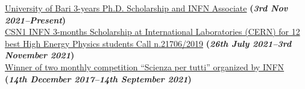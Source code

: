 \documentclass[11pt]{res}
\begin{document}
\begin{resume}
\href{https://dottorato.fisica.uniba.it}{University of Bari 3-years Ph.D. Scholarship and INFN Associate} \textbf{(\textit{3rd Nov 2021--Present})}\\
\href{https://drive.google.com/file/d/1-3EpNjAJlxgwI7W7nlvAxtIPrqbM1Xud/view?usp=sharing}{CSN1 INFN 3-months Scholarship at International Laboratories (CERN) for 12 best High Energy Physics students Call n.21706/2019} \textbf{(\textit{26th July 2021--3rd November 2021})}\\
\href{https://scienzapertutti.infn.it/spazio-scuola/concorso-mensile-sxt}{Winner of two monthly competition “Scienza per tutti” organized by INFN} \textbf{(\textit{14th December 2017--14th September 2021})}\\


\end{resume}
\end{document}
